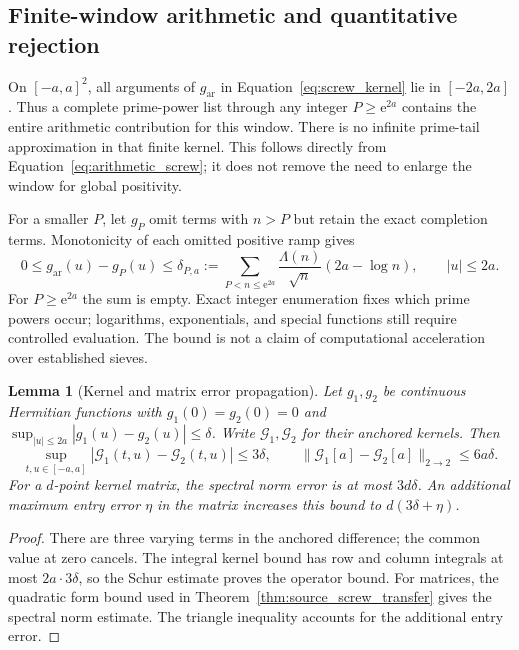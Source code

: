 \documentclass[11pt,letterpaper]{article}
\numberwithin{equation}{section}
\newtheorem{lemma}[theorem]{Lemma}
\theoremstyle{definition}
\theoremstyle{remark}
\newcommand{\e}{\mathrm e}
\begin{document}
\subsection{Finite-window arithmetic and quantitative rejection}
\label{subsec:screwerrorestimates}
On $[-a,a]^2$, all arguments of $g_{\mathrm{ar}}$ in Equation~\eqref{eq:screw_kernel} lie in $[-2a,2a]$. Thus a complete prime-power list through any integer $P\geq\e^{2a}$ contains the entire arithmetic contribution for this window. There is no infinite prime-tail approximation in that finite kernel. This follows directly from Equation~\eqref{eq:arithmetic_screw}; it does not remove the need to enlarge the window for global positivity.

For a smaller $P$, let $g_P$ omit terms with $n>P$ but retain the exact completion terms. Monotonicity of each omitted positive ramp gives
\begin{equation}
 0\leq g_{\mathrm{ar}}(u)-g_P(u)\leq\delta_{P,a}:=
 \sum_{P<n\leq\e^{2a}}\frac{\Lambda(n)}{\sqrt n}(2a-\log n),
 \qquad |u|\leq2a.
 \label{eq:screw_finite_prime_error}
\end{equation}
For $P\geq\e^{2a}$ the sum is empty. Exact integer enumeration fixes which prime powers occur; logarithms, exponentials, and special functions still require controlled evaluation. The bound is not a claim of computational acceleration over established sieves.

\begin{lemma}[Kernel and matrix error propagation]
\label{lem:screw_error}
Let $g_1,g_2$ be continuous Hermitian functions with $g_1(0)=g_2(0)=0$ and
$\sup_{|u|\leq2a}|g_1(u)-g_2(u)|\leq\delta$. Write $\mathscr G_1,\mathscr G_2$ for their anchored kernels. Then
\begin{equation}
 \sup_{t,u\in[-a,a]}|\mathscr G_1(t,u)-\mathscr G_2(t,u)|\leq3\delta,
 \qquad \|\mathscr G_1[a]-\mathscr G_2[a]\|_{2\to2}\leq6a\delta.
 \label{eq:screw_operator_error}
\end{equation}
For a $d$-point kernel matrix, the spectral norm error is at most $3d\delta$. An additional maximum entry error $\eta$ in the matrix increases this bound to $d(3\delta+\eta)$.
\end{lemma}
\begin{proof}
There are three varying terms in the anchored difference; the common value at zero cancels. The integral kernel bound has row and column integrals at most $2a\cdot3\delta$, so the Schur estimate proves the operator bound. For matrices, the quadratic form bound used in Theorem~\ref{thm:source_screw_transfer} gives the spectral norm estimate. The triangle inequality accounts for the additional entry error.
\end{proof}
\end{document}
